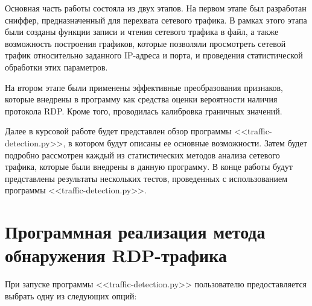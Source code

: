 \documentclass[bachelor, och, coursework]{SCWorks}
\begin{document}
Основная часть работы состояла из двух этапов. На первом этапе был разработан сниффер, предназначенный для перехвата сетевого трафика. 
В рамках этого этапа были созданы функции записи и чтения сетевого трафика в файл, а также возможность построения графиков, которые 
позволяли просмотреть сетевой трафик относительно заданного IP-адреса и порта, и проведения статистической обработки этих параметров.

На втором этапе были применены эффективные преобразования признаков, которые внедрены в программу как средства оценки вероятности наличия 
протокола RDP. Кроме того, проводилась калибровка граничных значений. 

Далее в курсовой работе будет представлен обзор программы <<traffic-detection.py>>, в котором будут описаны ее основные возможности. 
Затем будет подробно рассмотрен каждый из статистических методов анализа сетевого трафика, которые были внедрены в данную программу. 
В конце работы будут представлены результаты нескольких тестов, проведенных с использованием программы <<traffic-detection.py>>.


\section{Программная реализация метода обнаружения RDP-трафика}

При запуске программы <<traffic-detection.py>> пользователю предоставляется выбрать одну из следующих опций:
\end{document}
